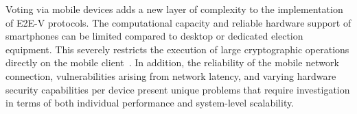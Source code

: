 \documentclass[a4paper,fleqn]{cas-sc}
\begin{document}

Voting via mobile devices adds a new layer of complexity to the implementation of E2E-V protocols. The computational capacity and reliable hardware support of smartphones can be limited compared to desktop or dedicated election equipment. This severely restricts the execution of large cryptographic operations directly on the mobile client~\cite{Peter2022}. In addition, the reliability of the mobile network connection, vulnerabilities arising from network latency, and varying hardware security capabilities per device present unique problems that require investigation in terms of both individual performance and system-level scalability.

\end{document}
